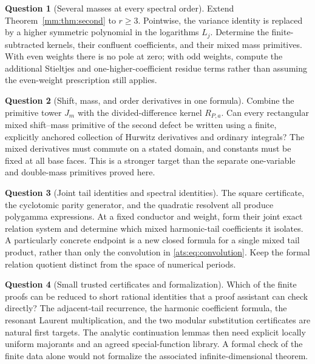 \documentclass[11pt,a4paper]{article}
\numberwithin{equation}{section}
\theoremstyle{definition}
\newtheorem{question}{Question}
\theoremstyle{remark}
\begin{document}
\begin{question}[Several masses at every spectral order]
Extend Theorem~\ref{mm:thm:second} to $r\ge3$. Pointwise, the variance
identity is replaced by a higher symmetric polynomial in the logarithms
$L_j$. Determine the finite-subtracted kernels, their confluent
coefficients, and their mixed mass primitives. With even weights
there is no pole at zero; with odd weights, compute the additional
Stieltjes and one-higher-coefficient residue terms rather than assuming
the even-weight prescription still applies.
\end{question}

\begin{question}[Shift, mass, and order derivatives in one formula]
Combine the primitive tower $J_m$ with the divided-difference kernel
$R_{P,a}$. Can every rectangular mixed shift--mass primitive of the
second defect be written using a finite, explicitly anchored collection
of Hurwitz derivatives and ordinary integrals? The mixed derivatives
must commute on a stated domain, and constants must be fixed at all
base faces. This is a stronger target than the separate one-variable
and double-mass primitives proved here.
\end{question}

\begin{question}[Joint tail identities and spectral identities]
The square certificate, the cyclotomic parity generator, and the
quadratic resolvent all produce polygamma expressions. At a fixed
conductor and weight, form their joint exact relation system and
determine which mixed harmonic-tail coefficients it isolates. A
particularly concrete endpoint is a new closed formula for a single
mixed tail product, rather than only the convolution in
\eqref{ats:eq:convolution}. Keep the formal relation quotient distinct
from the space of numerical periods.
\end{question}

\begin{question}[Small trusted certificates and formalization]
Which of the finite proofs can be reduced to short rational identities
that a proof assistant can check directly? The adjacent-tail recurrence,
the harmonic coefficient formula, the resonant Laurent multiplication,
and the two modular substitution certificates are natural first
targets. The analytic continuation lemmas then need explicit locally
uniform majorants and an agreed special-function library. A formal
check of the finite data alone would not formalize the associated
infinite-dimensional theorem.
\end{question}
\end{document}
